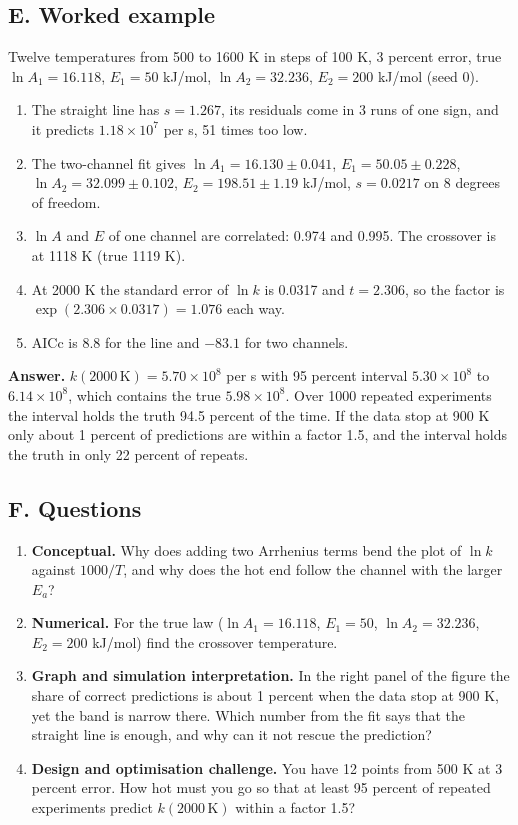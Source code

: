 \documentclass[11pt,a4paper]{article}
\begin{document}
\subsection*{E. Worked example}
Twelve temperatures from 500 to 1600 K in steps of 100 K, 3 percent error, true $\ln A_1=16.118$, $E_1=50$ kJ/mol, $\ln A_2=32.236$, $E_2=200$ kJ/mol (seed 0).
\begin{enumerate}[nosep]
\item The straight line has $s=1.267$, its residuals come in 3 runs of one sign, and it predicts $1.18\times10^7$ per s, 51 times too low.
\item The two-channel fit gives $\ln A_1=16.130\pm0.041$, $E_1=50.05\pm0.228$, $\ln A_2=32.099\pm0.102$, $E_2=198.51\pm1.19$ kJ/mol, $s=0.0217$ on 8 degrees of freedom.
\item $\ln A$ and $E$ of one channel are correlated: 0.974 and 0.995. The crossover is at 1118 K (true 1119 K).
\item At 2000 K the standard error of $\ln k$ is 0.0317 and $t=2.306$, so the factor is $\exp(2.306\times0.0317)=1.076$ each way.
\item AICc is 8.8 for the line and $-83.1$ for two channels.
\end{enumerate}
\textbf{Answer.} $k(2000\,\mathrm{K})=5.70\times10^8$ per s with 95 percent interval $5.30\times10^8$ to $6.14\times10^8$, which contains the true $5.98\times10^8$. Over 1000 repeated experiments the interval holds the truth 94.5 percent of the time. If the data stop at 900 K only about 1 percent of predictions are within a factor 1.5, and the interval holds the truth in only 22 percent of repeats.

\subsection*{F. Questions}
\begin{enumerate}[nosep]
\item \textbf{Conceptual.} Why does adding two Arrhenius terms bend the plot of $\ln k$ against $1000/T$, and why does the hot end follow the channel with the larger $E_a$?
\item \textbf{Numerical.} For the true law ($\ln A_1=16.118$, $E_1=50$, $\ln A_2=32.236$, $E_2=200$ kJ/mol) find the crossover temperature.
\item \textbf{Graph and simulation interpretation.} In the right panel of the figure the share of correct predictions is about 1 percent when the data stop at 900 K, yet the band is narrow there. Which number from the fit says that the straight line is enough, and why can it not rescue the prediction?
\item \textbf{Design and optimisation challenge.} You have 12 points from 500 K at 3 percent error. How hot must you go so that at least 95 percent of repeated experiments predict $k(2000\,\mathrm{K})$ within a factor 1.5?
\end{enumerate}
\end{document}

